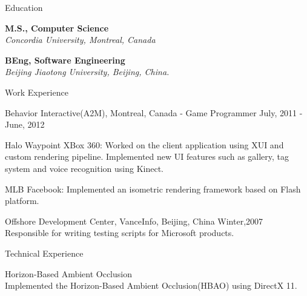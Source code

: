 \documentclass[10pt]{article}
\newenvironment{mydescription}{%
    \begin{description}
        \setlength{\itemsep}{0.25em}%
        \setlength{\parsep}{0em}%
        \setlength{\topsep}{\itemsep}%
        \setlength{\parskip}{0em}%
        \setlength{\labelwidth}{0.1em}
        \setlength{\labelsep}{0em} 
    }%
{\end{description}}
\begin{document}
\begin{cv}
\begin{cvlist}{Education}
    \item   \textbf{M.S., Computer Science}  \\ 
            \emph{Concordia University, Montreal, Canada}
    \item   \textbf{BEng, Software Engineering} \\
            \emph{Beijing Jiaotong University, Beijing, China.}
\end{cvlist}



\begin{cvlist}{Work Experience}
\item 
    \begin{mydescription}
		\item[Behavior Interactive(A2M), Montreal, Canada - Game Programmer]  \hfill July, 2011 - June, 2012 
			\begin{mydescription} 
			\item[Halo Waypoint XBox 360: ] {Worked on the client application using XUI and custom rendering pipeline. Implemented new UI features such as gallery, tag system and voice recognition using Kinect. }
			\item[MLB Facebook: ] {Implemented an isometric rendering framework based on Flash platform. }
			\end{mydescription}
        	\item[Offshore Development Center, VanceInfo, Beijing, China] \hfill Winter,2007 \\ 
            Responsible for writing testing scripts for Microsoft products. 
    \end{mydescription}
\end{cvlist}


\begin{cvlist}{Technical Experience}
\item
    \begin{mydescription}
        \item[Horizon-Based Ambient Occlusion] \hfill \\
			Implemented the Horizon-Based Ambient Occlusion(HBAO) using DirectX 11. 


\end{mydescription}
\end{cvlist}
\end{cv}
\end{document}
